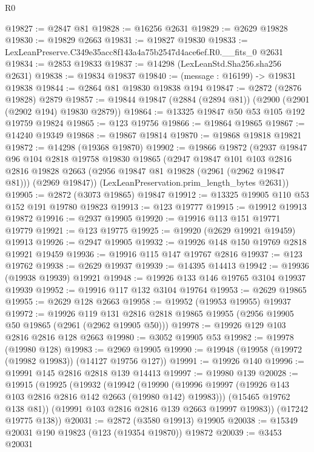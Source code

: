 \begin{lexlean}{R0}
\begin{coremodule}
@19827 := @2847 @81
@19828 := @16256 @2631
@19829 := @2629 @19828
@19830 := @19829 @2663
@19831 := @19827 @19830
@19833 := LexLeanPreserve.C349e35acc8f143a4a75b2547d4ace6ef.R0.__fits_0 @2631
@19834 := @2853 @19833
@19837 := @14298 (LexLeanStd.Sha256.sha256 @2631)
@19838 := @19834 @19837
@19840 := (message : @16199) -> @19831 @19838
@19844 := @2864 @81 @19830 @19838 @194
@19847 := @2872 (@2876 @19828) @2879
@19857 := @19844 @19847 (@2884 (@2894 @81)) (@2900 (@2901 (@2902 @194) @19830 @2879))
@19864 := @13325 @19847 @50 @53 @105 @192 @19759 @19824
@19865 := @123 @19756
@19866 := @19864 @19865
@19867 := @14240 @19349
@19868 := @19867 @19814
@19870 := @19868 @19818 @19821
@19872 := @14298 (@19368 @19870)
@19902 := @19866
    @19872
    (@2937
      @19847
      @96
      @104
      @2818
      @19758
      @19830
      @19865
      (@2947
        @19847
        @101
        @103
        @2816
        @2816
        @19828
        @2663
        (@2956 @19847 @81 @19828 (@2961 (@2962 @19847 @81)))
        (@2969 @19847))
      (LexLeanPreservation.prim_length_bytes @2631))
@19905 := @2872 (@3073 @19865) @19847
@19912 := @13325 @19905 @110 @53 @152 @191 @19780 @19823
@19913 := @123 @19777
@19915 := @19912 @19913 @19872
@19916 := @2937 @19905
@19920 := @19916 @113 @151 @19771 @19779
@19921 := @123 @19775
@19925 := @19920 (@2629 @19921 @19459) @19913
@19926 := @2947 @19905
@19932 := @19926 @148 @150 @19769 @2818 @19921 @19459
@19936 := @19916 @115 @147 @19767 @2816
@19937 := @123 @19762
@19938 := @2629 @19937
@19939 := @14395 @14413
@19942 := @19936 (@19938 @19939) @19921
@19948 := @19926 @133 @146 @19765 @3104 @19937 @19939
@19952 := @19916 @117 @132 @3104 @19764
@19953 := @2629 @19865
@19955 := @2629 @128 @2663
@19958 := @19952 (@19953 @19955) @19937
@19972 := @19926
    @119
    @131
    @2816
    @2818
    @19865
    @19955
    (@2956 @19905 @50 @19865 (@2961 (@2962 @19905 @50)))
@19978 := @19926 @129 @103 @2816 @2816 @128 @2663
@19980 := @3052 @19905 @53
@19982 := @19978 (@19980 @128)
@19983 := @2969 @19905
@19990 := @19948 (@19958 (@19972 (@19982 @19983)) (@14127 @19756 @127))
@19991 := @19926 @140
@19996 := @19991 @145 @2816 @2818 @139 @14413
@19997 := @19980 @139
@20028 := @19915
    (@19925
      (@19932
        (@19942
          (@19990 (@19996 @19997 (@19926 @143 @103 @2816 @2816 @142 @2663 (@19980 @142) @19983)))
          (@15465 @19762 @138 @81))
        (@19991 @103 @2816 @2816 @139 @2663 @19997 @19983))
      (@17242 @19775 @138))
@20031 := @2872 (@3580 @19913) @19905
@20038 := @15349 @20031 @190 @19823 (@123 (@19354 @19870)) @19872
@20039 := @3453 @20031

\end{coremodule}
\end{lexlean}
